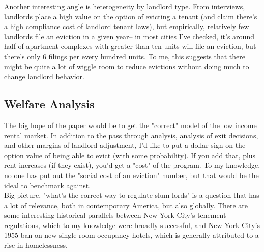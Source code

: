 \documentclass{article}
\begin{document}
Another interesting angle is heterogeneity by landlord type. From interviews, landlords place a high value on the option of evicting a tenant (and claim there's a high compliance cost of landlord tenant laws), but empirically, relatively few landlords file an eviction in a given year-- in most cities I've checked, it's around half of apartment complexes with greater than ten units will file an eviction, but there's only 6 filings per every hundred units. To me, this suggests that there might be quite a lot of wiggle room to reduce evictions without doing much to change landlord behavior.



\subsection{Welfare Analysis}

The big hope of the paper would be to get the "correct" model of the low income rental market. In addition to the pass through analysis, analysis of exit decisions, and other margins of landlord adjustment, I'd like to put a dollar sign on the option value of being able to evict (with some probability). If you add that, plus rent increases (if they exist), you'd get a "cost" of the program. To my knowledge, no one has put out the "social cost of an eviction" number, but that would be the ideal to benchmark against. \\

Big picture, "what's the correct way to regulate slum lords" is a question that has a lot of relevance, both in contemporary America, but also globally. There are some interesting historical parallels between New York City's tenement regulations, which to my knowledge were broadly successful, and New York City's 1955 ban on new single room occupancy hotels, which is generally attributed to a rise in homelessness.
\end{document}
